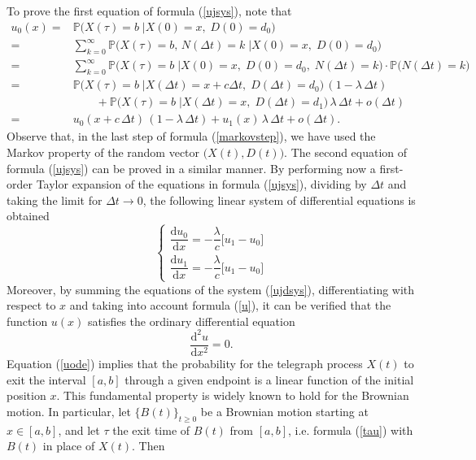 \documentclass{article}
\begin{document}
To prove the first equation of formula (\ref{ujsys}), note that
\begin{align}u_0(x)=&\mathbb{P}\Big(X(\tau)=b\;\Big\lvert X(0)=x,\; D(0)=d_0\Big)\nonumber\\
=&\sum_{k=0}^{\infty}\mathbb{P}\Big(X(\tau)=b,\,N(\Delta t)=k\;\Big\lvert X(0)=x,\; D(0)=d_0\Big)\nonumber\\
=&\sum_{k=0}^{\infty}\mathbb{P}\Big(X(\tau)=b\;\Big\lvert X(0)=x,\; D(0)=d_0,\;N(\Delta t)=k\Big)\cdot \mathbb{P}\big(N(\Delta t)=k\big)\nonumber\\[0.2em]
=&\mathbb{P}\Big(X(\tau)=b\;\Big\lvert X(\Delta t)=x+c\Delta t,\; D(\Delta t)=d_0\Big)\,(1-\lambda\,\Delta t)\nonumber\\[0.2em]
&\qquad+\mathbb{P}\Big(X(\tau)=b\;\Big\lvert X(\Delta t)=x,\; D(\Delta t)=d_1\Big)\,\lambda\,\Delta t+o(\Delta t)\nonumber\\[0.3em]
=&u_0(x+c\,\Delta t)\,(1-\lambda\,\Delta t)+u_1(x)\,\lambda\,\Delta t + o(\Delta t).\label{markovstep}
\end{align}
\noindent Observe that, in the last step of formula (\ref{markovstep}), we have used the Markov property of the random vector $\big(X(t),D(t)\big)$. The second equation of formula (\ref{ujsys}) can be proved in a similar manner. By performing now a first-order Taylor expansion of the equations in formula (\ref{ujsys}), dividing by $\Delta t$ and taking the limit for $\Delta t\to0$, the following linear system of differential equations is obtained
\begin{equation}\label{ujdsys}
\begin{cases}
\dfrac{\mathrm{d} u_0}{\mathrm{d}x}=-\dfrac{\lambda}{c}\big[u_1-u_0\big]\\[0.75em]
\dfrac{\mathrm{d} u_1}{\mathrm{d}x}=-\dfrac{\lambda}{c}\big[u_1-u_0\big]
\end{cases}
\end{equation}
Moreover, by summing the equations of the system (\ref{ujdsys}), differentiating with respect to $x$ and taking into account formula (\ref{u}), it can be verified that the function $u(x)$ satisfies the ordinary differential equation
\begin{equation}\label{uode}\dfrac{\mathrm{d}^2 u}{\mathrm{d}x^2}=0.\end{equation} Equation (\ref{uode}) implies that the probability for the telegraph process $X(t)$ to exit the interval $[a,b]$ through a given endpoint is a linear function of the initial position $x$. This fundamental property is widely known to hold for the Brownian motion. In particular, let $\{B(t)\}_{t\ge0}$ be a Brownian motion starting at $x\in[a,b]$, and let $\tau$ the exit time of $B(t)$ from $[a,b]$, i.e. formula (\ref{tau}) with $B(t)$ in place of $X(t)$. Then
\end{document}

